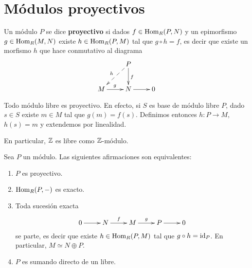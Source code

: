 \chapter{Módulos proyectivos}


\begin{definition}
Un módulo $P$ se dice \textbf{proyectivo} si dados $f\in\operatorname{Hom}_R(P,N)$ y un epimorfismo $g\in\operatorname{Hom}_R(M,N)$ 
existe $h\in\operatorname{Hom}_R(P,M)$ tal que $g\circ h=f$, es decir que existe un morfismo $h$ que
hace conmutativo al diagrama
\[
\xymatrix{ & P\ar[d]^f\ar@{-->}[ld]_h\\ M\ar[r]^g & N\ar[r] & 0	}
\]
\end{definition}

\begin{example}
Todo módulo libre es proyectivo. En efecto, si $S$ es base de módulo libre $P$, dado $s\in S$ existe
$m\in M$ tal que $g(m)=f(s)$. Definimos entonces
$h\colon P\to M$, $h(s)=m$ y extendemos por linealidad.  
\end{example}

En particular, $\mathbb{Z}$ es libre como $\mathbb{Z}$-módulo. 

\begin{theorem}
\label{thm:proyectivo}
	Sea $P$ un módulo. Las siguientes afirmaciones son equivalentes:
	\begin{enumerate}
		\item $P$ es proyectivo.
		\item $\operatorname{Hom}_R(P,-)$ es exacto.
		\item Toda sucesión exacta
			\[
			\xymatrix{
			0\ar[r] 
			& N
			\ar[r]^-{f}
			& M
			\ar[r]^-{g}
			& P\ar[r]
			& 0
			}
			\]
 			se parte, es decir que existe $h\in\operatorname{Hom}_R(P,M)$ tal que $g\circ h=\operatorname{id}_P$. En particular, 
 			$M\simeq N\oplus P$. 
 		\item $P$ es sumando directo de un libre.
	\end{enumerate}
\end{theorem}

